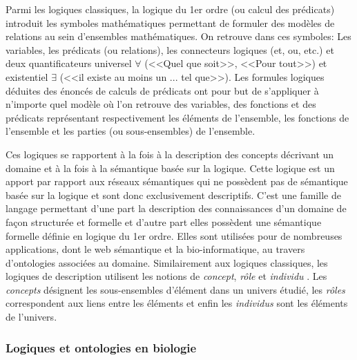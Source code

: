 Parmi les logiques classiques, la logique du 1er ordre (ou calcul des prédicats) introduit les symboles mathématiques permettant de formuler des modèles de relations au sein d'ensembles mathématiques. On retrouve dans ces symboles: Les variables, les prédicats (ou relations), les connecteurs logiques (et, ou, etc.) et deux quantificateurs universel $\forall$ (<<Quel que soit>>, <<Pour tout>>) et existentiel $\exists$ (<<il existe au moins un ... tel que>>). Les formules logiques déduites des énoncés de calculs de prédicats ont pour but de s'appliquer à n'importe quel modèle où l'on retrouve des variables, des fonctions et des prédicats représentant respectivement les éléments de l'ensemble, les fonctions de l'ensemble et les parties (ou sous-ensembles) de l'ensemble.



Ces logiques se rapportent à la fois à la description des concepts décrivant un domaine et à la fois à la sémantique basée sur la logique. Cette logique est un apport par rapport aux réseaux sémantiques qui ne possèdent pas de sémantique basée sur la logique et sont donc exclusivement descriptifs. C'est une famille de langage permettant d'une part la description des connaissances d'un domaine de façon structurée et formelle et d'autre part elles possèdent une sémantique formelle définie en logique du 1er ordre. Elles sont utilisées pour de nombreuses applications, dont le web sémantique et la bio-informatique, au travers d'ontologies associées au domaine. 
Similairement aux logiques classiques, les logiques de description utilisent les notions de \textit{concept}, \textit{rôle} et \textit{individu} \cite{baader2003description}. Les \textit{concepts} désignent les sous-ensembles d'élément dans un univers étudié, les \textit{rôles} correspondent aux liens entre les éléments et enfin les \textit{individus} sont les éléments de l'univers.


\subsubsection{Logiques et ontologies en biologie}

